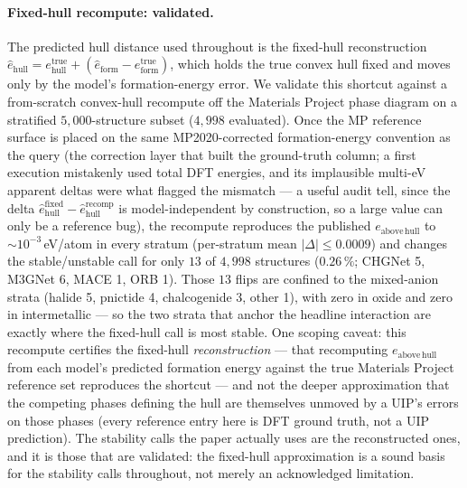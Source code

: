 \documentclass[11pt]{article}
\begin{document}
\paragraph{Fixed-hull recompute: validated.} The predicted hull distance used throughout is
the fixed-hull reconstruction $\hat{e}_{\mathrm{hull}} = e_{\mathrm{hull}}^{\mathrm{true}} +
(\hat{e}_{\mathrm{form}} - e_{\mathrm{form}}^{\mathrm{true}})$, which holds the true convex hull
fixed and moves only by the model's formation-energy error. We validate this shortcut against a
from-scratch convex-hull recompute off the Materials Project phase diagram on a stratified
$5{,}000$-structure subset ($4{,}998$ evaluated). Once the MP reference surface is placed on the
same MP2020-corrected formation-energy convention as the query (the correction layer that built
the ground-truth column; a first execution mistakenly used total DFT energies, and its
implausible multi-eV apparent deltas were what flagged the mismatch --- a useful audit tell,
since the delta $\hat{e}_{\mathrm{hull}}^{\mathrm{fixed}} - \hat{e}_{\mathrm{hull}}^{\mathrm{recomp}}$
is model-independent by construction, so a large value can only be a reference bug), the recompute
reproduces the published $e_{\mathrm{above\,hull}}$ to $\sim\!10^{-3}$\,eV/atom in every stratum
(per-stratum mean $|\Delta| \le 0.0009$) and changes the stable/unstable call for only
$13$ of $4{,}998$ structures ($0.26\,\%$; CHGNet 5, M3GNet 6, MACE 1, ORB 1). Those $13$ flips
are confined to the mixed-anion strata (halide 5, pnictide 4, chalcogenide 3, other 1), with
zero in oxide and zero in intermetallic --- so the two strata that anchor the
headline interaction are exactly where the fixed-hull call is most stable. One scoping caveat:
this recompute certifies the fixed-hull \emph{reconstruction} --- that recomputing
$e_{\mathrm{above\,hull}}$ from each model's predicted formation energy against the true Materials
Project reference set reproduces the shortcut --- and not the deeper approximation that the
competing phases defining the hull are themselves unmoved by a UIP's errors on those
phases (every reference entry here is DFT ground truth, not a UIP prediction). The stability
calls the paper actually uses are the reconstructed ones, and it is those that are validated: the
fixed-hull approximation is a sound basis for the stability calls throughout, not merely an
acknowledged limitation.
\end{document}
